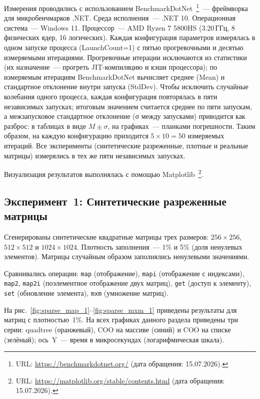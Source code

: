\documentclass[a4paper]{article}
\begin{document}
Измерения проводились с использованием BenchmarkDotNet~\footnote{URL: \url{https://benchmarkdotnet.org/} (дата обращения: 15.07.2026).}~--- фреймворка для микробенчмарков .NET. Среда исполнения~--- .NET 10. Операционная система~--- Windows 11. Процессор~--- AMD Ryzen 7 5800HS (3.20\,ГГц, 8 физических ядер, 16 логических). Каждая конфигурация параметров измерялась в одном запуске процесса (LaunchCount=1) с пятью прогревочными и десятью измеряемыми итерациями. Прогревочные итерации исключаются из статистики (их назначение~--- прогреть JIT-компиляцию и кэши процессора); по измеряемым итерациям BenchmarkDotNet вычисляет среднее (Mean) и стандартное отклонение внутри запуска (StdDev). Чтобы исключить случайные колебания одного процесса, каждая конфигурация повторялась в пяти независимых запусках; итоговым значением считается среднее по пяти запускам, а межзапусковое стандартное отклонение (σ между запусками) приводится как разброс: в таблицах в виде $M \pm \sigma$, на графиках~--- планками погрешности. Таким образом, на каждую конфигурацию приходится $5 \times 10 = 50$ измеряемых итераций. Все эксперименты (синтетические разреженные, плотные и реальные матрицы) измерялись в тех же пяти независимых запусках.

Визуализация результатов выполнялась с помощью Matplotlib~\footnote{URL: \url{https://matplotlib.org/stable/contents.html} (дата обращения: 15.07.2026).}.

\subsection{Эксперимент~1: Синтетические разреженные матрицы}

Сгенерированы синтетические квадратные матрицы трех размеров: $256 \times 256$, $512 \times 512$ и $1024 \times 1024$. Плотность заполнения~--- 1\% и 5\% (доля ненулевых элементов). Матрицы случайным образом заполнялись ненулевыми значениями.

Сравнивались операции: \texttt{map} (отображение), \texttt{mapi} (отображение с индексами), \texttt{map2}, \texttt{map2i} (поэлементное отображение двух матриц), \texttt{get} (доступ к элементу), \texttt{set} (обновление элемента), \texttt{mxm} (умножение матриц).

На рис.~\ref{fig:sparse_map_1}--\ref{fig:sparse_mxm_1} приведены результаты для матриц с плотностью~1\%. На всех графиках данного раздела приведены три серии: quadtree (оранжевый), COO на массиве (синий) и COO на списке (зелёный); ось~Y~--- время в микросекундах (логарифмическая шкала).
\end{document}
